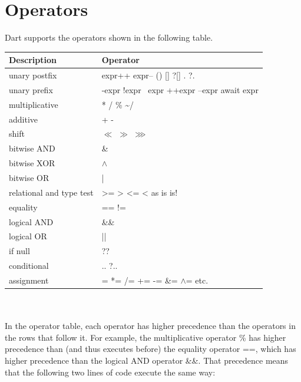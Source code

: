 \section{Operators}
Dart supports the operators shown in the following table. \\[0.3cm]

\begin{tabularx}{\linewidth}{ p{5cm}|p{9cm} } 
	\toprule	
	Description & Operator \\[0.3cm]	
	\midrule
	unary postfix & expr++    expr--    ()    []    ?[]    .    ?.\\[0.3cm]	
	unary prefix & -expr    !expr    ~expr    ++expr    --expr      await expr   \\[0.3cm]
	multiplicative & *    /    \%     \~{}/\\[0.3cm]
	additive & +    -\\[0.3cm]
	shift & $\ll$ $\gg$ \hspace{1cm}  $\ggg$\\[0.3cm]
	bitwise AND & \&\\[0.3cm]
	bitwise XOR & $\land$	 \\[0.3cm]
	bitwise OR & | \\[0.3cm]
	relational and type test & >=    >    <=    <    as    is    is!\\[0.3cm]
	equality & ==    !=   \\[0.3cm]
	logical AND & \&\& \\[0.3cm]
	logical OR & || \\[0.3cm]
	if null & 	?? \\[0.3cm]
	conditional & ..    ?.. \\[0.3cm]
	assignment & = \hspace{3cm}   *= \hspace{3cm}   /=\hspace{3cm}   += \hspace{3cm}  -= \hspace{3cm}   \&= \hspace{3cm}  $\land$= etc.\\
	
	\bottomrule
	
\end{tabularx}
\\\\
In the operator table, each operator has higher precedence than the operators in the rows that follow it. For example, the multiplicative operator \% has higher precedence than (and thus executes before) the equality operator ==, which has higher precedence than the logical AND operator \&\&. That precedence means that the following two lines of code execute the same way:


